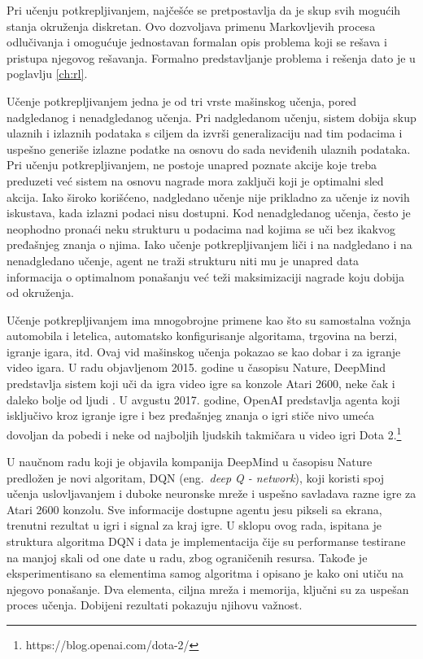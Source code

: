 \par
Pri učenju potkrepljivanjem, najčešće se pretpostavlja da je skup svih mogućih stanja okruženja diskretan. Ovo dozvoljava primenu Markovljevih procesa odlučivanja i omogućuje jednostavan formalan opis problema koji se rešava i pristupa njegovog rešavanja. Formalno predstavljanje problema i rešenja dato je u poglavlju \ref{ch:rl}.
\par
Učenje potkrepljivanjem jedna je od tri vrste mašinskog učenja, pored nadgledanog i nenadgledanog učenja. Pri nadgledanom učenju, sistem dobija skup ulaznih i izlaznih podataka s ciljem da izvrši generalizaciju nad tim podacima i uspešno generiše izlazne podatke na osnovu do sada neviđenih ulaznih podataka. Pri učenju potkrepljivanjem, ne postoje unapred poznate akcije koje treba preduzeti već sistem na osnovu nagrade mora zaključi koji je optimalni sled akcija. Iako široko korišćeno, nadgledano učenje nije prikladno za učenje iz novih iskustava, kada izlazni podaci nisu dostupni.  Kod nenadgledanog učenja, često je neophodno pronaći neku strukturu u podacima nad kojima se uči bez ikakvog pređašnjeg znanja o njima. Iako učenje potkrepljivanjem liči i na nadgledano i na nenadgledano učenje, agent ne traži strukturu niti mu je unapred data informacija o optimalnom ponašanju već teži maksimizaciji nagrade koju dobija od okruženja. \par
\par
Učenje potkrepljivanjem ima mnogobrojne primene kao što su samostalna vožnja automobila i letelica, automatsko konfigurisanje algoritama, trgovina na berzi, igranje igara, itd. Ovaj vid mašinskog učenja pokazao se kao dobar i za igranje video igara.  U radu objavljenom 2015. godine u časopisu Nature, DeepMind predstavlja sistem koji uči da igra video igre sa konzole Atari 2600, neke čak i daleko bolje od ljudi \cite{dqn_dm}. U avgustu 2017. godine, OpenAI predstavlja agenta koji isključivo kroz igranje igre i bez pređašnjeg znanja o igri stiče nivo umeća dovoljan da pobedi i neke od najboljih ljudskih takmičara u video igri Dota 2.\footnote{https://blog.openai.com/dota-2/} 
\par 
U naučnom radu koji je objavila kompanija DeepMind u časopisu Nature predložen je novi algoritam, DQN (eng.~{\em deep Q - network}), koji koristi spoj učenja uslovljavanjem i duboke neuronske mreže i uspešno savladava razne igre za Atari 2600 konzolu. Sve informacije dostupne agentu jesu pikseli sa ekrana, trenutni rezultat u igri i signal za kraj igre. U sklopu ovog rada, ispitana je struktura algoritma DQN i data je implementacija čije su performanse testirane na manjoj skali od one date u radu, zbog ograničenih resursa. Takođe je eksperimentisano sa elementima samog algoritma i opisano je kako oni utiču na njegovo ponašanje. Dva elementa, ciljna mreža i memorija, ključni su za uspešan proces učenja. Dobijeni rezultati pokazuju njihovu važnost. 
